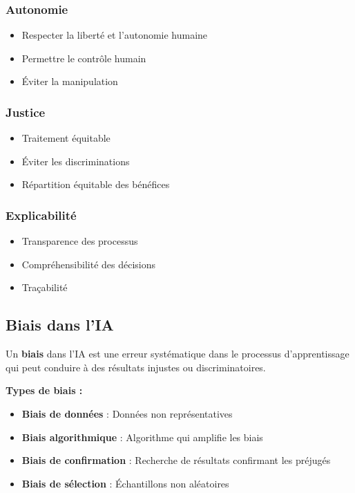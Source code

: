 \documentclass[11pt,a4paper]{article}
\begin{document}
\subsubsection{Autonomie}
\begin{itemize}
    \item Respecter la liberté et l'autonomie humaine
    \item Permettre le contrôle humain
    \item Éviter la manipulation
\end{itemize}

\subsubsection{Justice}
\begin{itemize}
    \item Traitement équitable
    \item Éviter les discriminations
    \item Répartition équitable des bénéfices
\end{itemize}

\subsubsection{Explicabilité}
\begin{itemize}
    \item Transparence des processus
    \item Compréhensibilité des décisions
    \item Traçabilité
\end{itemize}

\subsection{Biais dans l'IA}

\begin{definitionbox}
Un \textbf{biais} dans l'IA est une erreur systématique dans le processus d'apprentissage qui peut conduire à des résultats injustes ou discriminatoires.
\end{definitionbox}

\textbf{Types de biais :}
\begin{itemize}
    \item \textbf{Biais de données} : Données non représentatives
    \item \textbf{Biais algorithmique} : Algorithme qui amplifie les biais
    \item \textbf{Biais de confirmation} : Recherche de résultats confirmant les préjugés
    \item \textbf{Biais de sélection} : Échantillons non aléatoires
\end{itemize}
\end{document}
